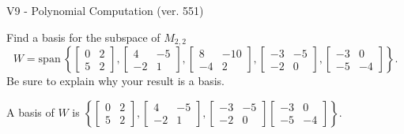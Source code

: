 \begin{exercise}
  \begin{exerciseTitle}V9 - Polynomial Computation (ver. 551)\end{exerciseTitle}
  \begin{exerciseStatement}
    Find a basis for the subspace of \(M_{2,2}\) 
\[W=\mathrm{span}\ \left\{\left[\begin{array}{cc}
0 & 2 \\
5 & 2
\end{array}\right] , \left[\begin{array}{cc}
4 & -5 \\
-2 & 1
\end{array}\right] , \left[\begin{array}{cc}
8 & -10 \\
-4 & 2
\end{array}\right] , \left[\begin{array}{cc}
-3 & -5 \\
-2 & 0
\end{array}\right] , \left[\begin{array}{cc}
-3 & 0 \\
-5 & -4
\end{array}\right]\right\}.\]
 Be sure to explain why your result is a basis.


  \end{exerciseStatement}
  \begin{exerciseAnswer}
   A basis of \(W\) is  \(\left\{\left[\begin{array}{cc}
0 & 2 \\
5 & 2
\end{array}\right] , \left[\begin{array}{cc}
4 & -5 \\
-2 & 1
\end{array}\right] , \left[\begin{array}{cc}
-3 & -5 \\
-2 & 0
\end{array}\right] \left[\begin{array}{cc}
-3 & 0 \\
-5 & -4
\end{array}\right]\right\}\).
  


  \end{exerciseAnswer}
\end{exercise}